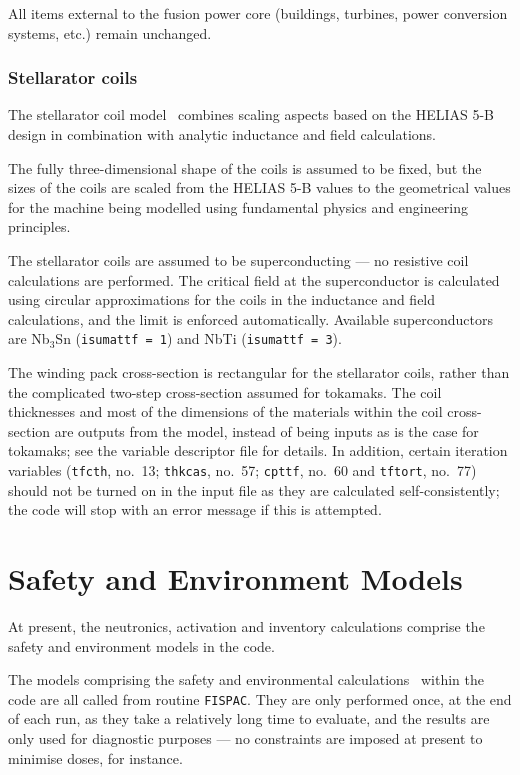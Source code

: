 \documentclass[11pt,a4paper]{report}
\begin{document}
All items external to the fusion power core (buildings, turbines, power
conversion systems, etc.) remain unchanged.

\subsubsection{Stellarator coils}

The stellarator coil model~\cite{stell_coil, stell_coil2} combines scaling
aspects based on the HELIAS 5-B design in combination with analytic inductance
and field calculations.

The fully three-dimensional shape of the coils is assumed to be fixed, but the
sizes of the coils are scaled from the HELIAS 5-B values to the geometrical
values for the machine being modelled using fundamental physics and
engineering principles.

The stellarator coils are assumed to be superconducting --- no resistive coil
calculations are performed.  The critical field at the superconductor is
calculated using circular approximations for the coils in the inductance and
field calculations, and the limit is enforced automatically. Available
superconductors are Nb$_3$Sn (\texttt{isumattf = 1}) and NbTi
(\texttt{isumattf = 3}).

The winding pack cross-section is rectangular for the stellarator coils,
rather than the complicated two-step cross-section assumed for tokamaks. The
coil thicknesses and most of the dimensions of the materials within the coil
cross-section are outputs from the model, instead of being inputs as is the
case for tokamaks; see the variable descriptor file for details. In addition,
certain iteration variables (\texttt{tfcth}, no.\ 13; \texttt{thkcas}, no.\
57; \texttt{cpttf}, no.\ 60 and \texttt{tftort}, no.\ 77) should not be turned
on in the input file as they are calculated self-consistently; the code will
stop with an error message if this is attempted.



\section{Safety and Environment Models}

At present, the neutronics, activation and inventory calculations comprise the
safety and environment models in the code.

The models comprising the safety and environmental calculations~\cite{FISPACT}
within the code are all called from routine \texttt{FISPAC}. They are only
performed once, at the end of each run, as they take a relatively long time to
evaluate, and the results are only used for diagnostic purposes --- no
constraints are imposed at present to minimise doses, for instance.
\end{document}
